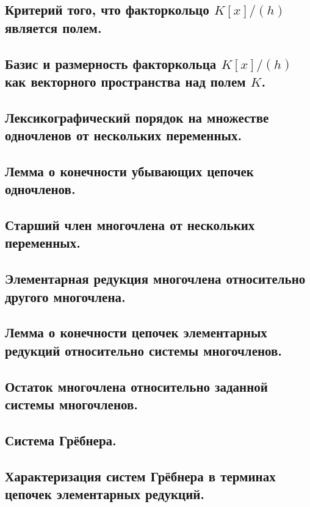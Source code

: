 \mysection
\subsection{Критерий того, что факторкольцо \texorpdfstring{$K[x]/(h)$}{Lg} является полем.}
\subsection{Базис и размерность факторкольца \texorpdfstring{$K[x]/(h)$}{Lg} как векторного
            пространства над полем \texorpdfstring{$K$}{Lg}.}

\newpage
\mysection
\subsection{Лексикографический порядок на множестве одночленов
            от нескольких переменных.}
\subsection{Лемма о конечности убывающих цепочек одночленов.}

\newpage
\mysection
\subsection{Старший член многочлена от нескольких переменных.}
\subsection{Элементарная редукция многочлена относительно другого многочлена.}
\subsection{Лемма о конечности цепочек элементарных
            редукций относительно системы многочленов.}

\newpage
\mysection
\subsection{Остаток многочлена относительно заданной системы многочленов.}
\subsection{Система Грёбнера.}
\subsection{Характеризация систем Грёбнера
            в терминах цепочек элементарных редукций.}


